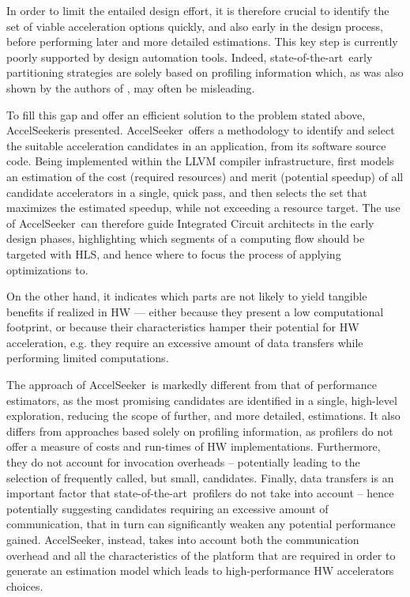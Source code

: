 \documentclass[]{usiinfthesis}
\newcommand{\aseeker}{{AccelSeeker}}
\newcommand{\SoTA}{{state-of-the-art}}
\begin{document}
In order to limit the entailed design effort, it is therefore crucial to identify the set of viable 
acceleration options quickly, and also early in the design process, before performing later and more 
detailed estimations. This key step is currently poorly supported by design automation tools. Indeed, 
\SoTA\ early partitioning strategies are solely based on profiling information \cite{XilinxESTRef18} 
\cite{LattnerMar04} which, as was also shown by the authors of \cite{SyrowikJun18}, may often be 
misleading.\par

To fill this gap and offer an efficient solution to the problem stated above, \aseeker is presented. 
\aseeker\ offers a methodology to identify and select the suitable acceleration candidates in an
application, from its software source code. Being implemented within the LLVM \cite{LattnerMar04} compiler 
infrastructure, first models an estimation of the cost (required resources) and merit (potential speedup) 
of all candidate accelerators in a single, quick pass, and then selects the set that maximizes the estimated 
speedup, while not exceeding a resource target. The use of \aseeker\ can therefore guide Integrated Circuit 
architects in the early design phases, highlighting which segments of a computing flow should be
targeted with HLS, and hence where to focus the process of applying optimizations to.\par

On the other hand, it indicates which parts are not likely to yield tangible benefits if realized in HW --- either 
because they present a low computational footprint, or because their characteristics hamper their potential for HW 
acceleration, e.g. they require an excessive amount of data transfers while performing limited computations.\par

The approach of \aseeker\ is markedly different from that of performance estimators, as the most promising 
candidates are identified in a single, high-level exploration, reducing the scope of further, and more detailed, 
estimations. It also differs from approaches based solely on profiling information, as profilers do not offer a 
measure of costs and run-times of HW implementations. Furthermore, they do not account for invocation overheads -- 
potentially leading to the selection of frequently called, but small, candidates. Finally, data transfers is an 
important factor that \SoTA\ profilers do not take into account -- hence potentially suggesting candidates 
requiring an excessive amount of communication, that in turn can significantly weaken any potential performance 
gained. \aseeker, instead, takes into account both the communication overhead and all the characteristics of the 
platform that are required in order to generate an estimation model which leads
to high-performance HW accelerators choices.
\end{document}
